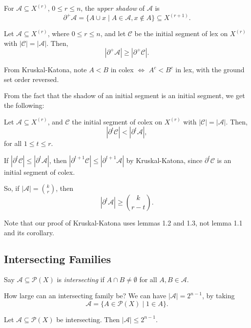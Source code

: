 \documentclass[12pt]{article}
\begin{document}
For $\mathcal{A} \subseteq X^{(r)}$, $0 \leq r \leq n$, the \emph{upper shadow} of $\mathcal{A}$ is
\[
	\partial^+ \mathcal{A} = \{A \cup x \mid A \in \mathcal{A}, x \not \in A\} \subseteq X^{(r + 1)}.
\]

\begin{corollary}
	Let $\mathcal{A} \subseteq X^{(r)}$, where $0 \leq r \leq n$, and let $\mathcal{C}$ be the initial segment of lex on $X^{(r)}$ with $|\mathcal{C}| = |\mathcal{A}|$. Then,
	\[
		|\partial^+ \mathcal{A}| \geq |\partial^+ \mathcal{C}|.
	\]
\end{corollary}

\begin{proofbox}
	From Kruskal-Katona, note $A < B$ in colex $\iff$ $A^{c} < B^{c}$ in lex, with the ground set order reversed.
\end{proofbox}

From the fact that the shadow of an initial segment is an initial segment, we get the following:

\begin{corollary}
	Let $\mathcal{A} \subseteq X^{(r)}$, and $\mathcal{C}$ the initial segment of colex on $X^{(r)}$ with $|\mathcal{C}| = |\mathcal{A}|$. Then,
	\[
		|\partial^t \mathcal{C}| < |\partial^t \mathcal{A}|,
	\]
	for all $1 \leq t \leq r$.
\end{corollary}

\begin{proofbox}
	If $|\partial^t \mathcal{C}| \leq |\partial^t \mathcal{A}|$, then $|\partial^{t+1} \mathcal{C}| \leq |\partial^{t+1} \mathcal{A}|$ by Kruskal-Katona, since $\partial^t \mathcal{C}$ is an initial segment of colex.
\end{proofbox}

So, if $|\mathcal{A}| = \binom kr$, then
\[
	|\partial^t \mathcal{A}| \geq \binom k{r-t}.
\]

Note that our proof of Kruskal-Katona uses lemmas 1.2 and 1.3, not lemma 1.1 and its corollary.

\subsection{Intersecting Families}%
\label{sub:int_fam}

Say $\mathcal{A} \subseteq \mathcal{P}(X)$ is \emph{intersecting} if $A \cap B \neq \emptyset$ for all $A, B \in \mathcal{A}$.

How large can an intersecting family be? We can have $|\mathcal{A}| = 2^{n-1}$, by taking
\[
	\mathcal{A} = \{A \in \mathcal{P}(X) \mid 1 \in A\}.
\]
\begin{proposition}
	Let $\mathcal{A} \subseteq \mathcal{P}(X)$ be intersecting. Then $|\mathcal{A}| \leq 2^{n-1}$.
\end{proposition}
\end{document}
